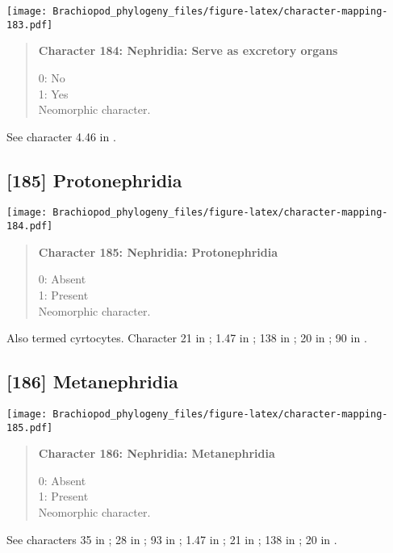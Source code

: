 \documentclass[openany]{book}
\theoremstyle{definition}
\theoremstyle{definition}
\theoremstyle{definition}
\theoremstyle{remark}
\begin{document}
\texttt{[image: Brachiopod\_phylogeny\_files/figure-latex/character-mapping-183.pdf]}

\begin{quote}
\textbf{Character 184: Nephridia: Serve as excretory organs}

0: No\\
1: Yes\\
Neomorphic character.
\end{quote}

See character 4.46 in \citet{SPS1996}.

\subsection*{{[}185{]} Protonephridia}\label{protonephridia}

\texttt{[image: Brachiopod\_phylogeny\_files/figure-latex/character-mapping-184.pdf]}

\begin{quote}
\textbf{Character 185: Nephridia: Protonephridia}

0: Absent\\
1: Present\\
Neomorphic character.
\end{quote}

Also termed cyrtocytes. Character 21 in \citet{Grobe2007}; 1.47 in
\citet{SPS1996}; 138 in \citet{Rouse1999}; 20 in \citet{Haszprunar1996};
90 in \citet{Glenner2004}.

\subsection*{{[}186{]} Metanephridia}\label{metanephridia}

\texttt{[image: Brachiopod\_phylogeny\_files/figure-latex/character-mapping-185.pdf]}

\begin{quote}
\textbf{Character 186: Nephridia: Metanephridia}

0: Absent\\
1: Present\\
Neomorphic character.
\end{quote}

See characters 35 in \citet{Rouse1999}; 28 in \citet{Haszprunar2000}; 93
in \citet{Glenner2004}; 1.47 in \citet{SPS1996}; 21 in
\citet{Grobe2007}; 138 in \citet{Rouse1999}; 20 in
\citet{Haszprunar1996}.
\end{document}
